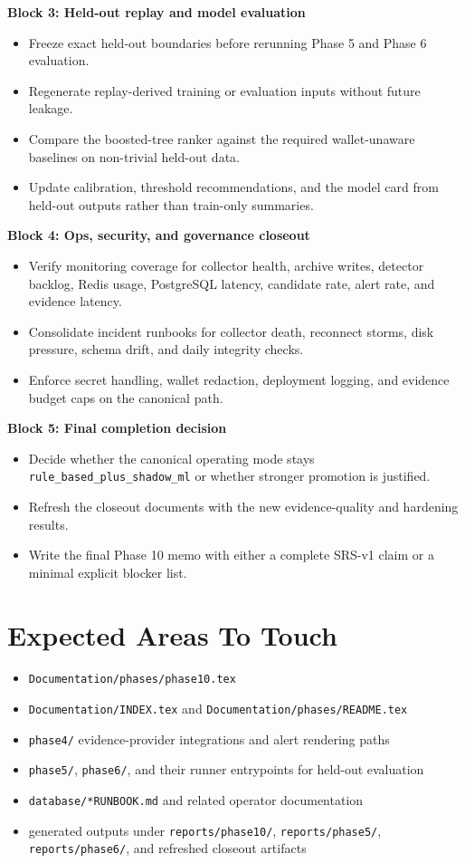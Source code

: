 \documentclass{article}
\begin{document}
\textbf{Block 3: Held-out replay and model evaluation}
\begin{itemize}
\item Freeze exact held-out boundaries before rerunning Phase 5 and Phase 6 evaluation.
\item Regenerate replay-derived training or evaluation inputs without future leakage.
\item Compare the boosted-tree ranker against the required wallet-unaware baselines on non-trivial held-out data.
\item Update calibration, threshold recommendations, and the model card from held-out outputs rather than train-only summaries.
\end{itemize}

\textbf{Block 4: Ops, security, and governance closeout}
\begin{itemize}
\item Verify monitoring coverage for collector health, archive writes, detector backlog, Redis usage, PostgreSQL latency, candidate rate, alert rate, and evidence latency.
\item Consolidate incident runbooks for collector death, reconnect storms, disk pressure, schema drift, and daily integrity checks.
\item Enforce secret handling, wallet redaction, deployment logging, and evidence budget caps on the canonical path.
\end{itemize}

\textbf{Block 5: Final completion decision}
\begin{itemize}
\item Decide whether the canonical operating mode stays \texttt{rule\_based\_plus\_shadow\_ml} or whether stronger promotion is justified.
\item Refresh the closeout documents with the new evidence-quality and hardening results.
\item Write the final Phase 10 memo with either a complete SRS-v1 claim or a minimal explicit blocker list.
\end{itemize}

\section*{Expected Areas To Touch}
\begin{itemize}
\item \texttt{Documentation/phases/phase10.tex}
\item \texttt{Documentation/INDEX.tex} and \texttt{Documentation/phases/README.tex}
\item \texttt{phase4/} evidence-provider integrations and alert rendering paths
\item \texttt{phase5/}, \texttt{phase6/}, and their runner entrypoints for held-out evaluation
\item \texttt{database/*RUNBOOK.md} and related operator documentation
\item generated outputs under \texttt{reports/phase10/}, \texttt{reports/phase5/}, \texttt{reports/phase6/}, and refreshed closeout artifacts
\end{itemize}
\end{document}
